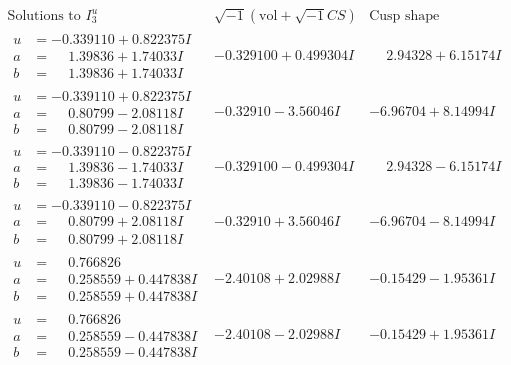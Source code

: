 \documentclass[1p]{elsarticle_modified}
\theoremstyle{definition}
\newcommand{\I}{\sqrt{-1}}
\begin{document}
$$\begin{array}{c|c|c}  
\text{Solutions to }I^u_{3}& \I (\text{vol} + \sqrt{-1}CS) & \text{Cusp shape}\\
 \hline 
\begin{aligned}
u &= -0.339110 + 0.822375 I \\
a &= \phantom{-}1.39836 + 1.74033 I \\
b &= \phantom{-}1.39836 + 1.74033 I\end{aligned}
 & -0.329100 + 0.499304 I & \phantom{-}2.94328 + 6.15174 I \\ \hline\begin{aligned}
u &= -0.339110 + 0.822375 I \\
a &= \phantom{-}0.80799 - 2.08118 I \\
b &= \phantom{-}0.80799 - 2.08118 I\end{aligned}
 & -0.32910 - 3.56046 I & -6.96704 + 8.14994 I \\ \hline\begin{aligned}
u &= -0.339110 - 0.822375 I \\
a &= \phantom{-}1.39836 - 1.74033 I \\
b &= \phantom{-}1.39836 - 1.74033 I\end{aligned}
 & -0.329100 - 0.499304 I & \phantom{-}2.94328 - 6.15174 I \\ \hline\begin{aligned}
u &= -0.339110 - 0.822375 I \\
a &= \phantom{-}0.80799 + 2.08118 I \\
b &= \phantom{-}0.80799 + 2.08118 I\end{aligned}
 & -0.32910 + 3.56046 I & -6.96704 - 8.14994 I \\ \hline\begin{aligned}
u &= \phantom{-}0.766826\phantom{ +0.000000I} \\
a &= \phantom{-}0.258559 + 0.447838 I \\
b &= \phantom{-}0.258559 + 0.447838 I\end{aligned}
 & -2.40108 + 2.02988 I & -0.15429 - 1.95361 I \\ \hline\begin{aligned}
u &= \phantom{-}0.766826\phantom{ +0.000000I} \\
a &= \phantom{-}0.258559 - 0.447838 I \\
b &= \phantom{-}0.258559 - 0.447838 I\end{aligned}
 & -2.40108 - 2.02988 I & -0.15429 + 1.95361 I \\ \hline\begin{aligned}

\end{aligned}
\end{array}$$
\end{document}
